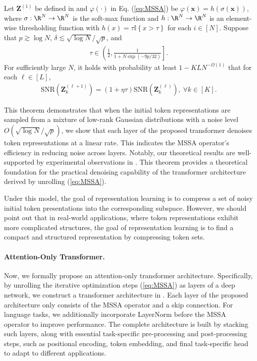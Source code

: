 \documentclass[../../book-main.tex]{subfiles}
\begin{document}
\begin{theorem}\label{thm:1}
Let $\bm Z^{(1)}$ be defined in  and $\varphi(\cdot)$ in Eq. (\ref{eq:MSSA}) be 
$\varphi(\bm x) = h\left(\sigma(\bm x)\right)$,
where $\sigma:\R^N \to \R^N$ is the soft-max function and $h:\R^N \to \R^N$ is an element-wise thresholding function with $h(x) = \tau \mathbb{I}\left\{x > \tau\right\}$ for each $i \in [N]$. Suppose that $p \gtrsim \log N$, $\delta \lesssim \sqrt{\log N}/\sqrt{p}$, and 
\begin{align*}
\tau \in \left( \frac{1}{2},  \frac{1}{1+N\exp(-9p/32)} \right].
\end{align*}
For sufficiently large $N$, it holds with probability at least $1-KLN^{-\Omega(1)}$ that for each $\ell \in [L]$, 
    \begin{align}\label{eq:SNR}
        \mathrm{SNR}(\bm Z_k^{(\ell+1)}) = (1+\eta\tau) \mathrm{SNR}(\bm Z_k^{(\ell)}),\ \forall k \in [K]. 
    \end{align}
\end{theorem}
This theorem demonstrates that when the initial token representations are sampled from a mixture of low-rank Gaussian distributions with a noise level $O(\sqrt{\log N}/\sqrt{p})$, we show that each layer of the proposed transformer denoises token representations at a linear rate. This indicates the MSSA operator's efficiency in reducing noise across layers. Notably, our theoretical results are well-supported by experimental observations in . This theorem provides a theoretical foundation for the practical denoising capability of the transformer architecture derived by unrolling (\ref{eq:MSSA}). 

\begin{remark}
    Under this model, the goal of representation learning is to compress a set of noisy initial token presentations into the corresponding subspace. However, we should point out that in real-world applications, where token representations exhibit more complicated structures, the goal of representation learning is to find a compact and structured representation by compressing token sets. 
\end{remark}


\paragraph{Attention-Only Transformer.} Now, we formally propose an attention-only transformer architecture. Specifically, by unrolling the iterative optimization steps (\ref{eq:MSSA}) as layers of a deep network, we construct a transformer architecture in . Each layer of the proposed architecture only consists of the MSSA operator and a skip connection. For language tasks, we additionally incorporate LayerNorm before the MSSA operator to improve performance. The complete architecture is built by stacking such layers, along with essential task-specific pre-processing and post-processing steps, such as positional encoding, token embedding, and final task-specific head to adapt to different applications. 
\end{document}
